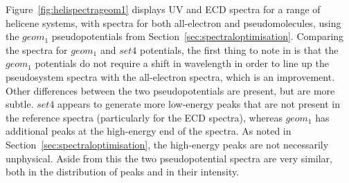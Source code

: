 \documentclass[aip,reprint,nofootinbib]{revtex4-1}
\begin{document}
Figure~\ref{fig:helispectrageom1} displays UV and ECD spectra for a range of helicene systems, with spectra for both all-electron and pseudomolecules, using the $geom_1$ pseudopotentials from Section~\ref{sec:spectraloptimisation}. Comparing the spectra for $geom_1$ and $set4$ potentials, the first thing to note in is that the $geom_1$ potentials do not require a shift in wavelength in order to line up the pseudosystem spectra with the all-electron spectra, which is an improvement. Other differences between the two pseudopotentials are present, but are more subtle. $set4$ appears to generate more low-energy peaks that are not present in the reference spectra (particularly for the ECD spectra), whereas $geom_1$ has additional peaks at the high-energy end of the spectra. As noted in Section~\ref{sec:spectraloptimisation}, the high-energy peaks are not necessarily unphysical. Aside from this the two pseudopotential spectra are very similar, both in the distribution of peaks and in their intensity.
\end{document}
